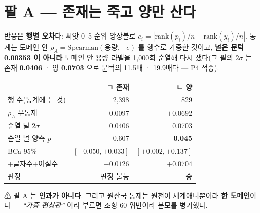 \documentclass[10pt]{article}
\begin{document}
\section{팔 A --- 존재는 죽고 양만 산다}

반응은 \textbf{행별 오차}다: 씨앗 0--5 순위 앙상블로
$e_i=|\mathrm{rank}(p_i)/n-\mathrm{rank}(y_i)/n|$. 통계는 도메인 안
$\rho_A=\mathrm{Spearman}(\text{용량},-e)$ 를 행수로 가중한 것이고, \textbf{널은 문턱
0.00353 이 아니라} 도메인 안 용량 라벨을 1,000회 순열해 다시 쟀다(그 팔의 $2\sigma$
는 존재 \textbf{0.0406} · 양 \textbf{0.0703} 으로 문턱의 11.5배 · 19.9배다 ---
P4 적중).

\begin{table}[h]\centering\small
\begin{tabular}{lrr}
\hline
 & ㄱ 존재 & ㄴ 양 \\
\hline
행 수(통계에 든 것) & 2,398 & 829 \\
$\rho_A$ 무통제 & $-0.0097$ & $\mathbf{+0.0692}$ \\
순열 널 $2\sigma$ & 0.0406 & 0.0703 \\
순열 널 양측 $p$ & 0.607 & \textbf{0.045} \\
BCa 95\% & $[-0.050,+0.033]$ & $\mathbf{[+0.002,+0.137]}$ \\
$+$글자수$+$어절수 & $-0.0126$ & $+0.0704$ \\
판정 & 판정 불능 & 승 \\
\hline
\end{tabular}
\end{table}


⚠ 팔 A 는 \textbf{인과가 아니다}. 그리고 원산국 통제는 원천이 세계애니뿐이라
\textbf{한 도메인}이다 --- \emph{``가중 편상관''} 이라 부르면 조항 60 위반이라
분모를 병기했다.
\end{document}
